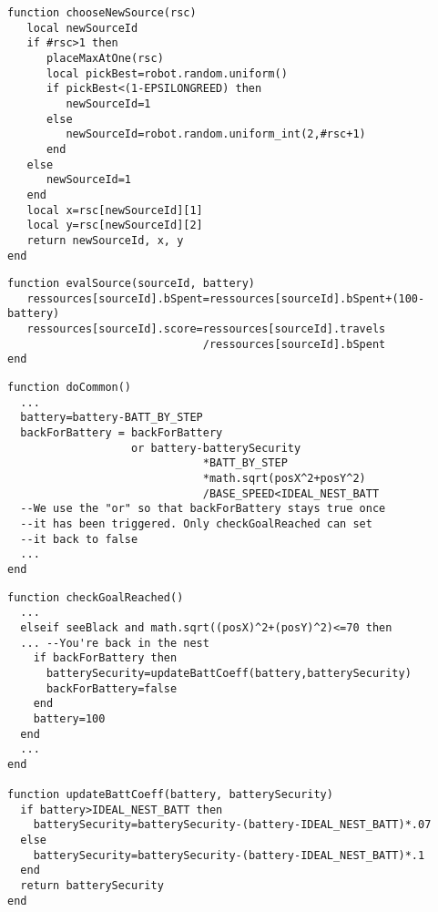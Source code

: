 \begin{subappendices}
\begin{lstlisting}[caption=Choix de la ressource à exploiter]
function chooseNewSource(rsc)
   local newSourceId
   if #rsc>1 then
      placeMaxAtOne(rsc)
      local pickBest=robot.random.uniform()
      if pickBest<(1-EPSILONGREED) then
         newSourceId=1
      else
         newSourceId=robot.random.uniform_int(2,#rsc+1)
      end
   else
      newSourceId=1
   end
   local x=rsc[newSourceId][1]
   local y=rsc[newSourceId][2]
   return newSourceId, x, y
end
\end{lstlisting}

\begin{lstlisting}[caption=Evaluation de la qualité de la source]
function evalSource(sourceId, battery)
   ressources[sourceId].bSpent=ressources[sourceId].bSpent+(100-battery)
   ressources[sourceId].score=ressources[sourceId].travels
                              /ressources[sourceId].bSpent
end
\end{lstlisting}

\begin{lstlisting}[caption=appel par doCommon]
function doCommon()
  ...
  battery=battery-BATT_BY_STEP
  backForBattery = backForBattery
                   or battery-batterySecurity
                              *BATT_BY_STEP
                              *math.sqrt(posX^2+posY^2)
                              /BASE_SPEED<IDEAL_NEST_BATT
  --We use the "or" so that backForBattery stays true once
  --it has been triggered. Only checkGoalReached can set
  --it back to false
  ...
end
\end{lstlisting}

\begin{lstlisting}[caption=Réévaluation de batterySecurity]
function checkGoalReached()
  ...
  elseif seeBlack and math.sqrt((posX)^2+(posY)^2)<=70 then
  ... --You're back in the nest
    if backForBattery then
      batterySecurity=updateBattCoeff(battery,batterySecurity)
      backForBattery=false
    end
    battery=100
  end
  ...
end

function updateBattCoeff(battery, batterySecurity)
  if battery>IDEAL_NEST_BATT then
    batterySecurity=batterySecurity-(battery-IDEAL_NEST_BATT)*.07
  else
    batterySecurity=batterySecurity-(battery-IDEAL_NEST_BATT)*.1
  end
  return batterySecurity
end
\end{lstlisting}




\end{subappendices}
